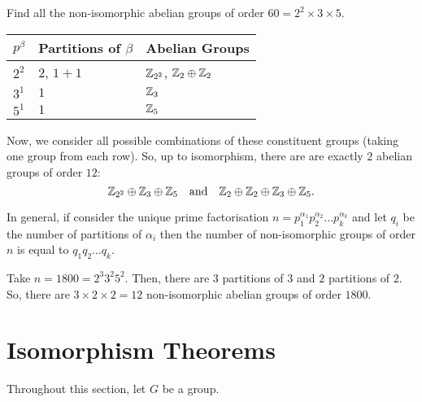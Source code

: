 \documentclass[11pt]{penrose}
\begin{document}
\begin{negg}
    Find all the non-isomorphic abelian groups of order $60 = 2^{2} \times 3 \times 5$.
    \begin{center}
        \begin{tabularx}{0.66\textwidth}{p{8mm}XX}
            \toprule
            $p^{\beta}$ & Partitions of $\beta$ & Abelian Groups\\
            \midrule
            $2^{2}$ & $2$, $1+1$ & $\mathbb{Z}_{2^{2}}$, $\mathbb{Z}_{2} \oplus \mathbb{Z}_{2}$ \\
            $3^{1}$ & $1$        & $\mathbb{Z}_{3}$ \\
            $5^{1}$ & $1$        & $\mathbb{Z}_{5}$ \\
            \bottomrule
        \end{tabularx}
    \end{center}
    Now, we consider all possible combinations of these constituent groups (taking one group from each row). So, up to isomorphism, there are are exactly $2$ abelian groups of order $12$:
    \begin{equation*}
        \mathbb{Z}_{2^{2}} \oplus \mathbb{Z}_{3} \oplus \mathbb{Z}_{5}
        \quad\text{and}\quad 
        \mathbb{Z}_{2} \oplus \mathbb{Z}_{2} \oplus \mathbb{Z}_{3} \oplus \mathbb{Z}_{5}.
    \end{equation*}
\end{negg}

In general, if consider the unique prime factorisation $n = p_{1}^{\alpha_{1}} p_{2}^{\alpha_{2}} \dots p_{k}^{\alpha_{k}}$ and let $q_{i}$ be the number of partitions of $\alpha_{i}$ then the number of non-isomorphic groups of order $n$ is equal to $q_{1} q_{2} \dots q_{k}$.

\begin{negg}
    Take $n = 1800 = 2^{3} 3^{2} 5^{2}$. Then, there are $3$ partitions of $3$ and $2$ partitions of $2$. So, there are $3 \times 2 \times 2 = 12$ non-isomorphic abelian groups of order $1800$.
\end{negg}


\section{Isomorphism Theorems}

Throughout this section, let $G$ be a group.
\end{document}
